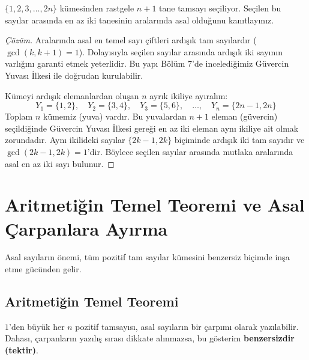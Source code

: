 \begin{example}
$\{1, 2, 3, \dots, 2n\}$ kümesinden rastgele $n+1$ tane tamsayı seçiliyor. Seçilen bu sayılar arasında en az iki tanesinin aralarında asal olduğunu kanıtlayınız.
\end{example}

\begin{proof}[Çözüm]
Aralarında asal en temel sayı çiftleri ardışık tam sayılardır ($\gcd(k, k+1) = 1$). Dolayısıyla seçilen sayılar arasında ardışık iki sayının varlığını garanti etmek yeterlidir. Bu yapı Bölüm 7'de incelediğimiz Güvercin Yuvası İlkesi ile doğrudan kurulabilir.

Kümeyi ardışık elemanlardan oluşan $n$ ayrık ikiliye ayıralım:
\[ Y_1 = \{1, 2\}, \quad Y_2 = \{3, 4\}, \quad Y_3 = \{5, 6\}, \quad \dots, \quad Y_n = \{2n-1, 2n\} \]
Toplam $n$ kümemiz (yuva) vardır.
Bu yuvalardan $n+1$ eleman (güvercin) seçildiğinde Güvercin Yuvası İlkesi gereği en az iki eleman aynı ikiliye ait olmak zorundadır.
Aynı ikilideki sayılar $\{2k-1, 2k\}$ biçiminde ardışık iki tam sayıdır ve $\gcd(2k-1, 2k) = 1$'dir. Böylece seçilen sayılar arasında mutlaka aralarında asal en az iki sayı bulunur.
\end{proof}

\section{Aritmetiğin Temel Teoremi ve Asal Çarpanlara Ayırma}

Asal sayıların önemi, tüm pozitif tam sayılar kümesini benzersiz biçimde inşa etme gücünden gelir.

\subsection{Aritmetiğin Temel Teoremi}

\begin{theorem}
$1$'den büyük her $n$ pozitif tamsayısı, asal sayıların bir çarpımı olarak yazılabilir. Dahası, çarpanların yazılış sırası dikkate alınmazsa, bu gösterim \textbf{benzersizdir (tektir)}.
\end{theorem}

